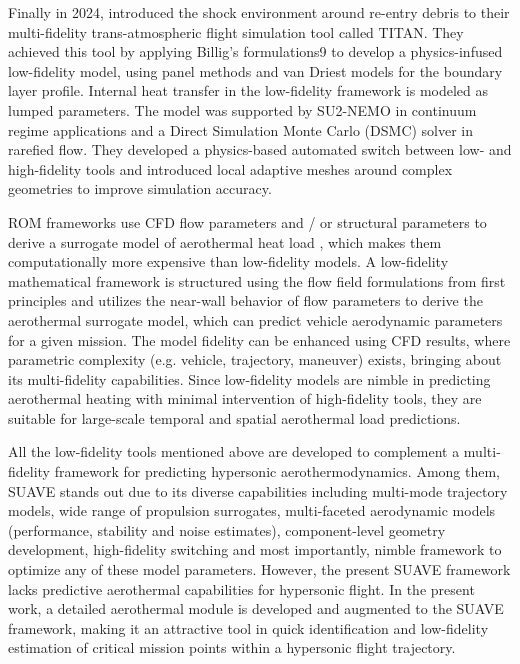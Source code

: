 \documentclass[%
 aip,
 amsmath,amssymb,
preprint,%
]{revtex4-1}
\begin{document}
Finally in 2024, \cite{morgado_multifidelity_2024} introduced the shock environment around re-entry debris to their multi-fidelity trans-atmospheric flight simulation tool called TITAN. They achieved this tool by applying Billig’s formulations9 to develop a physics-infused low-fidelity model, using panel methods and van Driest models for the boundary layer profile. Internal heat transfer in the low-fidelity framework is modeled as lumped parameters. The model was supported by SU2-NEMO in continuum regime applications and a Direct Simulation Monte Carlo (DSMC) solver in rarefied flow. They developed a physics-based automated switch between low- and high-fidelity tools and introduced local adaptive meshes around complex geometries to improve simulation accuracy.





ROM frameworks use CFD flow parameters and / or structural parameters to derive a surrogate model of aerothermal heat load \citep{crowell_reduced_2010}, which makes them computationally more expensive than low-fidelity models. A low-fidelity mathematical framework is structured using the flow field formulations from first principles and utilizes the near-wall behavior of flow parameters to derive the aerothermal surrogate model, which can predict vehicle aerodynamic parameters for a given mission. The model fidelity can be enhanced using CFD results, where parametric complexity (e.g. vehicle, trajectory, maneuver) exists, bringing about its multi-fidelity capabilities. Since low-fidelity models are nimble in predicting aerothermal heating with minimal intervention of high-fidelity tools, they are suitable for large-scale temporal and spatial aerothermal load predictions.  




All the low-fidelity tools mentioned above are developed to complement a multi-fidelity framework for predicting hypersonic aerothermodynamics. Among them, SUAVE stands out due to its diverse capabilities including multi-mode trajectory models, wide range of propulsion surrogates, multi-faceted aerodynamic models (performance, stability and noise estimates), component-level geometry development, high-fidelity switching and most importantly, nimble framework to optimize any of these model parameters. However, the present SUAVE framework lacks predictive aerothermal capabilities for hypersonic flight. In the present work, a detailed aerothermal module is developed and augmented to the SUAVE framework, making it an attractive tool in quick identification and low-fidelity estimation of critical mission points within a hypersonic flight trajectory.
\end{document}
